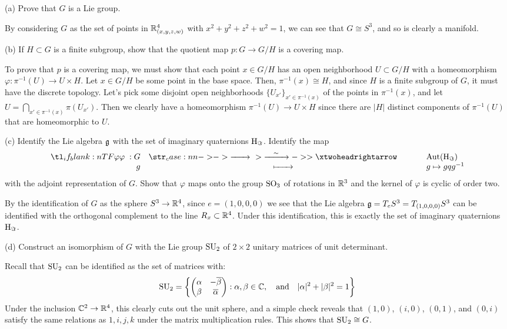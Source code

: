 \documentclass{../../templates/lkx_pset}
\begin{document}
\begin{parts}
	\begin{part}{(a)}
		Prove that $G$ is a Lie group.
	\end{part}

	By considering $G$ as the set of points in $\mathbb{R}^4_{(x,y,z,w)}$ with $x^2+y^2+z^2+w^2=1$, we can see that $G\cong S^3$, and so is clearly a manifold.

	\begin{part}{(b)}
		If $H\subset G$ is a finite subgroup, show that the quotient map $p : G \to G/H$ is a covering map.
	\end{part}

	To prove that $p$ is a covering map, we must show that each point $x\in G/H$ has an open neighborhood $U\subset G/H$ with a homeomorphism $\varphi : \pi^{-1}(U) \to U\times H$. Let $x\in G/H$ be some point in the base space. Then, $\pi^{-1}(x)\cong H$, and since $H$ is a finite subgroup of $G$, it must have the discrete topology. Let's pick some disjoint open neighborhoods $\{U_{x'}\}_{x'\in \pi^{-1}(x)}$ of the points in $\pi^{-1}(x)$, and let $U = \bigcap_{x'\in \pi^{-1}(x)} \pi(U_{x'})$. Then we clearly have a homeomorphism $\pi^{-1}(U) \to U\times H$ since there are $|H|$ distinct components of $\pi^{-1}(U)$ that are homeomorphic to $U$.

	\begin{part}{(c)}
		Identify the Lie algebra $\mathfrak{g}$ with the set of imaginary quaternions $\operatorname{H}_\Im$. Identify the map
		\[
			\lkxfunc{\varphi}{G}{\Aut(\HH_\Im)}{g}{g\mapsto gqg^{-1}}
		\]
		with the adjoint representation of $G$. Show that $\varphi$ maps onto the group $\operatorname{SO}_3$ of rotations in $\mathbb{R}^3$ and the kernel of $\varphi$ is cyclic of order two.
	\end{part}

	By the identification of $G$ as the sphere $S^3\to \mathbb{R}^4$, since $e=(1,0,0,0)$ we see that the Lie algebra $\mathfrak{g}=T_eS^3=T_{(1,0,0,0)}S^3$ can be identified with the orthogonal complement to the line $R_x\subset \mathbb{R}^4$. Under this identification, this is exactly the set of imaginary quaternions $\operatorname{H}_\Im$.

	\begin{part}{(d)}
		Construct an isomorphism of $G$ with the Lie group $\operatorname{SU}_2$ of $2\times 2$ unitary matrices of unit determinant.
	\end{part}

	Recall that $\operatorname{SU}_2$ can be identified as the set of matrices with:
	\[
		\operatorname{SU}_2 = \left\{ \begin{pmatrix}\alpha & -\overline{\beta}\\ \beta & \overline{\alpha}\end{pmatrix} : \alpha,\beta\in \mathbb{C},\quad\textrm{and}\quad |\alpha|^2 + |\beta|^2=1\right\}
	\]
	Under the inclusion $\mathbb{C}^2 \to \mathbb{R}^4$, this clearly cuts out the unit sphere, and a simple check reveals that $(1, 0)$, $(i,0)$, $(0,1)$, and $(0,i)$ satisfy the same relations as $1,i,j,k$ under the matrix multiplication rules. This shows that $\operatorname{SU}_2\cong G$.


\end{parts}
\end{document}
